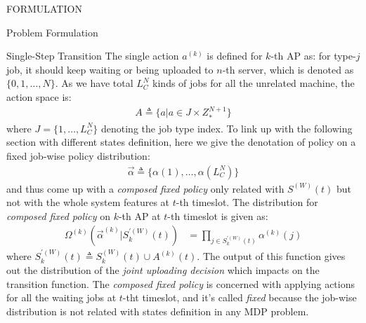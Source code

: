 \documentclass[10pt, conference, letterpaper]{IEEEtran}
\begin{document}
\begin{section}{FORMULATION}
\begin{subsection}{Problem Formulation}
\begin{subsubsection}{Single-Step Transition}
                The single action $a^{(k)}$ is defined for $k$-th AP as: for type-$j$ job, it should keep waiting or being uploaded to $n$-th server, which is denoted as $\{0,1,\dots,N\}$. As we have total $L_C^{N}$ kinds of jobs for all the unrelated machine, the action space is:
                \begin{align}
                    A \triangleq \{a|a \in J \times Z_*^{N+1}\}
                \end{align}
                where $J=\{1, \dots, L_C^{N}\}$ denoting the job type index. To link up with the following section with different states definition, here we give the denotation of policy on a fixed job-wise policy distribution:
                \begin{align}
                    \vec{\alpha} \triangleq \{\alpha(1),\dots,\alpha(L_C^{N})\}
                \end{align}
                and thus come up with a \emph{composed fixed policy} only related with $S^{(W)}(t)$
                but not with the whole system features at $t$-th timeslot. The distribution for \emph{composed fixed policy} on $k$-th AP at $t$-th timeslot is given as:
                \begin{align}
                    \Omega^{(k)}(\vec{\alpha}^{(k)}|S^{'(W)}_k(t)) &= \prod_{j \in S^{'(W)}_k(t)} \alpha^{(k)}(j)
                \end{align}
                where $S^{'(W)}_k(t) \triangleq S^{(W)}_k(t) \cup A^{(k)}(t)$. The output of this function gives out the distribution of the \emph{joint uploading decision} which impacts on the transition function. The \emph{composed fixed policy} is concerned with applying actions for all the waiting jobs at $t$-tht timeslot, and it's called \emph{fixed} because the job-wise distribution is not related with states definition in any MDP problem.


\end{subsubsection}
\end{subsection}
\end{section}
\end{document}
